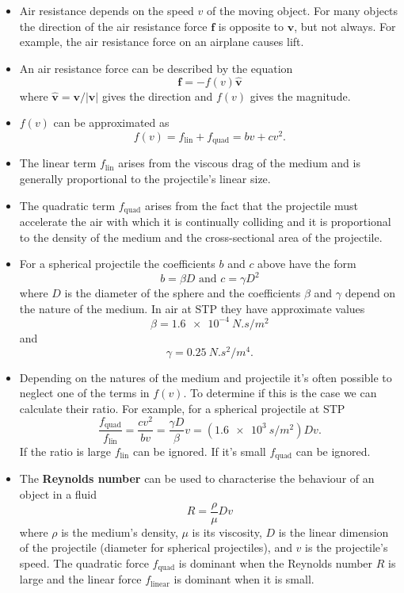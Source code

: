 \documentclass{article}
\renewcommand{\vec}[1]{\boldsymbol{\mathbf{#1}}}
\newcommand{\uvec}[1]{\hat{\vec{#1}}}
\begin{document}
\begin{itemize}
  \item Air resistance depends on the speed $v$ of the moving object. For many objects the direction of the air resistance force $\vec{f}$ is opposite to $\vec{v}$, but not always. For example, the air resistance force on an airplane causes lift.

  \item An air resistance force can be described by the equation \[\vec{f} = -f(v) \uvec{v}\] where $\uvec{v} = \vec{v} / |\vec{v}|$ gives the direction and $f(v)$ gives the magnitude.

  \item $f(v)$ can be approximated as \[f(v) = f_\text{lin} + f_\text{quad} = b v + c v^2.\]

  \item The linear term $f_\text{lin}$ arises from the viscous drag of the medium and is generally proportional to the projectile's linear size.

  \item The quadratic term $f_\text{quad}$ arises from the fact that the projectile must accelerate the air with which it is continually colliding and it is proportional to the density of the medium and the cross-sectional area of the projectile.

  \item For a spherical projectile the coefficients $b$ and $c$ above have the form \[b = \beta D \text{ and } c = \gamma D^2\] where $D$ is the diameter of the sphere and the coefficients $\beta$ and $\gamma$ depend on the nature of the medium. In air at STP they have approximate values \[\beta = \qty{1.6e-4}{N.s/m^2}\] and \[\gamma = \qty{0.25}{N.s^2/m^4}.\]

  \item Depending on the natures of the medium and projectile it's often possible to neglect one of the terms in $f(v)$. To determine if this is the case we can calculate their ratio. For example, for a spherical projectile at STP \[\frac{f_\text{quad}}{f_\text{lin}} = \frac{c v^2}{b v} = \frac{\gamma D}{\beta} v = (\qty{1.6e3}{s/m^2}) D v.\] If the ratio is large $f_\text{lin}$ can be ignored. If it's small $f_\text{quad}$ can be ignored.

  \item The \textbf{Reynolds number} can be used to characterise the behaviour of an object in a fluid \[R = \frac{\rho}{\mu} D v\] where $\rho$ is the medium's density, $\mu$ is its viscosity, $D$ is the linear dimension of the projectile (diameter for spherical projectiles), and $v$ is the projectile's speed. The quadratic force $f_\text{quad}$ is dominant when the Reynolds number $R$ is large and the linear force $f_\text{linear}$ is dominant when it is small.
\end{itemize}
\end{document}
